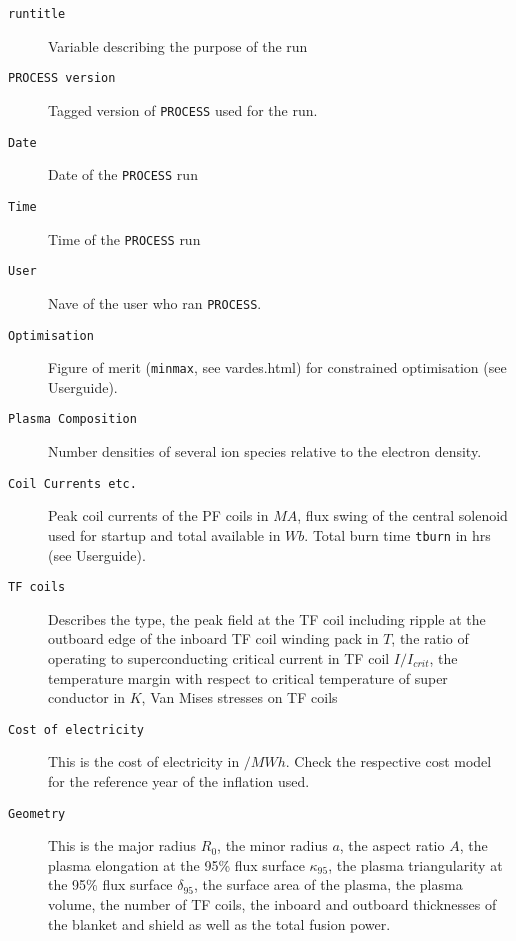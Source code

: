 \documentclass[11pt,a4paper]{article}
\newcommand{\process}{\mbox{\texttt{PROCESS}}}
\begin{document}
\begin{description}
\item[\texttt{runtitle}] Variable describing the purpose of the run
\item[\texttt{PROCESS version}]Tagged version of \process\/ used for the run.
\item[\texttt{Date}] Date of the \process\/ run
\item[\texttt{Time}] Time of the \process\/ run
\item[\texttt{User}] Nave of the user who ran \process.
\item[\texttt{Optimisation}] Figure of merit (\texttt{minmax}, see vardes.html) for constrained optimisation (see Userguide).
\item[\texttt{Plasma Composition}] Number densities of several ion species relative to the electron density.
\item[\texttt{Coil Currents etc.}] Peak coil currents of the PF coils in $MA$, flux swing of the central solenoid used for startup and total available in $Wb$. Total burn time \texttt{tburn} in hrs (see Userguide).
\item[\texttt{TF coils}] Describes the type, the peak field at the TF coil including ripple at the outboard edge of the inboard TF coil winding pack in $T$, the ratio of operating to superconducting critical current in TF coil $I/I_{crit}$, the temperature margin with respect to critical temperature of super conductor in $K$, Van Mises stresses on TF coils
\item[\texttt{Cost of electricity}] This is the cost of electricity in $/MWh$. Check the respective cost model for the reference year of the inflation used.
\item[\texttt{Geometry}] This is the major radius $R_0$, the minor radius $a$, the aspect ratio $A$, the plasma elongation at the 95\% flux surface $\kappa_{95}$, the plasma triangularity at the 95\% flux surface $\delta_{95}$, the surface area of the plasma, the plasma volume, the number of TF coils, the inboard and outboard thicknesses of the blanket and shield as well as the total fusion power.

\end{description}
\end{document}
